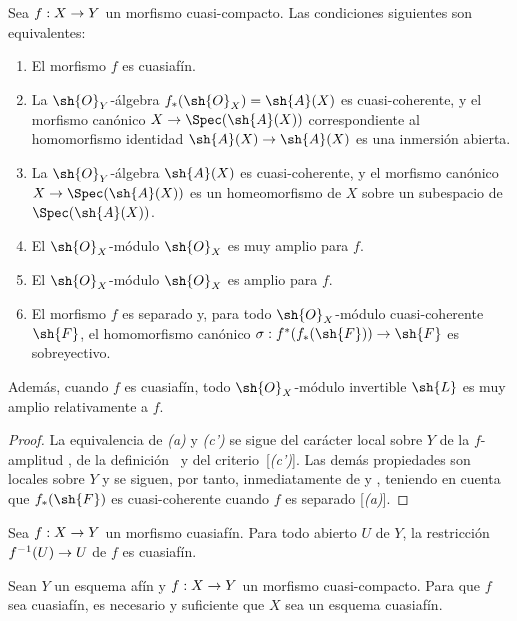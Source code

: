 \documentclass[oneside,10pt]{amsart}
\makeatletter
\newcommand{\ega@arrow}[2]{\mathchoice{#1}{#2}{#2}{#2}}
\renewcommand{\to}{\ega@arrow{\longrightarrow}{\rightarrow}}
\newcommand{\oldpage}[2][]{\marginnote{\normalfont\footnotesize\textbf{#1}~|~#2}\ignorespaces}
\let\EGAOriginalLabel\label
\renewcommand{\label}[1]{\phantomsection\EGAOriginalLabel{#1}}
\makeatother
\begin{document}
\begin{proposition}[5.1.6]
\label{II.5.1.6}
Sea $f:X\to Y$ un morfismo cuasi-compacto.
Las condiciones siguientes son equivalentes:
\begin{enumerate}
  \item[{\rm(a)}] El morfismo $f$ es cuasiafín.
  \item[{\rm(b)}] La $\sh{O}_Y$-álgebra $f_*(\sh{O}_X)=\sh{A}(X)$ es cuasi-coherente, y el morfismo canónico $X\to\Spec(\sh{A}(X))$ correspondiente al homomorfismo identidad $\sh{A}(X)\to\sh{A}(X)$ \textup{} es una inmersión abierta.
  \item[{\rm(b')}] La $\sh{O}_Y$-álgebra $\sh{A}(X)$ es cuasi-coherente, y el morfismo canónico $X\to\Spec(\sh{A}(X))$ es un homeomorfismo de $X$ sobre un subespacio de $\Spec(\sh{A}(X))$.
  \item[{\rm(c)}] El $\sh{O}_X$-módulo $\sh{O}_X$ es muy amplio para $f$.
  \item[{\rm(c')}] El $\sh{O}_X$-módulo $\sh{O}_X$ es amplio para $f$.
  \item[{\rm(d)}] El morfismo $f$ es separado y, para todo $\sh{O}_X$-módulo cuasi-coherente $\sh{F}$, el homomorfismo canónico $\sigma:f^*(f_*(\sh{F}))\to\sh{F}$  es sobreyectivo.
\end{enumerate}

Además, cuando $f$ es cuasiafín, todo $\sh{O}_X$-módulo invertible $\sh{L}$ es muy amplio relativamente a $f$.
\end{proposition}

\begin{proof}
La equivalencia de \emph{(a)} y \emph{(c')} se sigue del carácter local sobre $Y$ de la $f$-amplitud , de la definición~ y del criterio~[\emph{(c')}].
Las demás propiedades son locales sobre $Y$
\oldpage[II]{96}
y se siguen, por tanto, inmediatamente de  y , teniendo en cuenta que $f_*(\sh{F})$ es cuasi-coherente cuando $f$ es separado [\emph{(a)}].
\end{proof}

\begin{corollary}[5.1.7]
\label{II.5.1.7}
Sea $f:X\to Y$ un morfismo cuasiafín.
Para todo abierto $U$ de $Y$, la restricción $f^{-1}(U)\to U$ de $f$ es cuasiafín.
\end{corollary}

\begin{corollary}[5.1.8]
\label{II.5.1.8}
Sean $Y$ un esquema afín y $f:X\to Y$ un morfismo cuasi-compacto.
Para que $f$ sea cuasiafín, es necesario y suficiente que $X$ sea un esquema cuasiafín.
\end{corollary}
\end{document}
